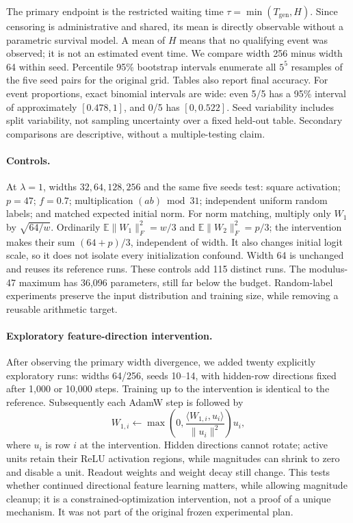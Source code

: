 \documentclass{article}
\begin{document}
The primary endpoint is the restricted waiting time $\tau=\min(T_{\mathrm{gen}},H)$. Since censoring is administrative and shared, its mean is directly observable without a parametric survival model. A mean of $H$ means that no qualifying event was observed; it is not an estimated event time. We compare width 256 minus width 64 within seed. Percentile 95\% bootstrap intervals enumerate all $5^5$ resamples of the five seed pairs for the original grid. Tables also report final accuracy. For event proportions, exact binomial intervals are wide: even 5/5 has a 95\% interval of approximately $[0.478,1]$, and 0/5 has $[0,0.522]$. Seed variability includes split variability, not sampling uncertainty over a fixed held-out table. Secondary comparisons are descriptive, without a multiple-testing claim.

\paragraph{Controls.}
At $\lambda=1$, widths $32,64,128,256$ and the same five seeds test: square activation; $p=47$; $f=0.7$; multiplication $(ab)\bmod31$; independent uniform random labels; and matched expected initial norm. For norm matching, multiply only $W_1$ by $\sqrt{64/w}$. Ordinarily $\mathbb E\|W_1\|_F^2=w/3$ and $\mathbb E\|W_2\|_F^2=p/3$; the intervention makes their sum $(64+p)/3$, independent of width. It also changes initial logit scale, so it does not isolate every initialization confound. Width 64 is unchanged and reuses its reference runs. These controls add 115 distinct runs. The modulus-47 maximum has 36,096 parameters, still far below the budget. Random-label experiments preserve the input distribution and training size, while removing a reusable arithmetic target.

\paragraph{Exploratory feature-direction intervention.}
After observing the primary width divergence, we added twenty explicitly exploratory runs: widths 64/256, seeds 10--14, with hidden-row directions fixed after 1,000 or 10,000 steps. Training up to the intervention is identical to the reference. Subsequently each AdamW step is followed by
\[
 W_{1,i}\leftarrow \max\!\left(0,\frac{\langle W_{1,i},u_i\rangle}{\|u_i\|^2}\right)u_i,
\]
where $u_i$ is row $i$ at the intervention. Hidden directions cannot rotate; active units retain their ReLU activation regions, while magnitudes can shrink to zero and disable a unit. Readout weights and weight decay still change. This tests whether continued directional feature learning matters, while allowing magnitude cleanup; it is a constrained-optimization intervention, not a proof of a unique mechanism. It was not part of the original frozen experimental plan.
\end{document}
